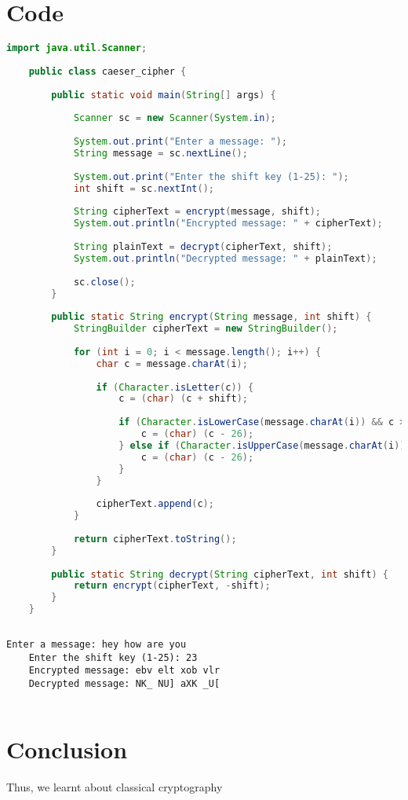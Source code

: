 \documentclass{article}
\begin{document}
\section{\textbf{Code}}
\begin{lstlisting}[language=java, caption={Input}]
	import java.util.Scanner;
	
	public class caeser_cipher {
		
		public static void main(String[] args) {
			
			Scanner sc = new Scanner(System.in);
			
			System.out.print("Enter a message: ");
			String message = sc.nextLine();
			
			System.out.print("Enter the shift key (1-25): ");
			int shift = sc.nextInt();
			
			String cipherText = encrypt(message, shift);
			System.out.println("Encrypted message: " + cipherText);
			
			String plainText = decrypt(cipherText, shift);
			System.out.println("Decrypted message: " + plainText);
			
			sc.close();
		}
		
		public static String encrypt(String message, int shift) {
			StringBuilder cipherText = new StringBuilder();
			
			for (int i = 0; i < message.length(); i++) {
				char c = message.charAt(i);
				
				if (Character.isLetter(c)) {
					c = (char) (c + shift);
					
					if (Character.isLowerCase(message.charAt(i)) && c > 'z') {
						c = (char) (c - 26);
					} else if (Character.isUpperCase(message.charAt(i)) && c > 'Z') {
						c = (char) (c - 26);
					}
				}
				
				cipherText.append(c);
			}
			
			return cipherText.toString();
		}
		
		public static String decrypt(String cipherText, int shift) {
			return encrypt(cipherText, -shift);
		}
	}
	
\end{lstlisting}

\begin{lstlisting}[caption={Output}]
	Enter a message: hey how are you
	Enter the shift key (1-25): 23
	Encrypted message: ebv elt xob vlr
	Decrypted message: NK_ NU] aXK _U[
	
\end{lstlisting}
\section{\textbf{Conclusion}}
Thus, we learnt about classical cryptography
\end{document}
